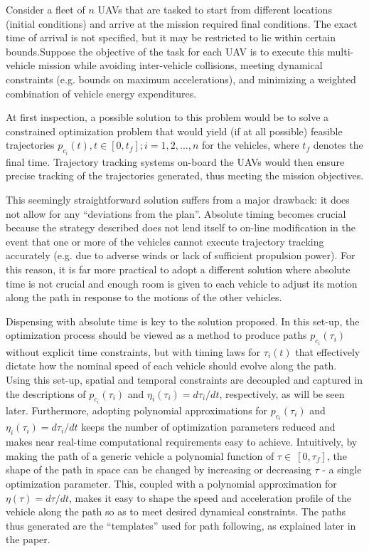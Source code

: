\documentclass[]{aiaa-tc}%
\begin{document}
Consider a fleet of $n$ UAVs that are tasked to start from different
locations (initial conditions) and arrive at the mission required final
conditions. The exact time of arrival is not specified, but it may be
restricted to lie within certain bounds.Suppose the objective of the task
for each UAV is to execute this multi-vehicle mission while avoiding
inter-vehicle collisions, meeting dynamical constraints (e.g. bounds on
maximum accelerations), and minimizing a weighted combination of vehicle
energy expenditures.

At first inspection, a possible solution to this problem would be to solve a
constrained optimization problem that would yield (if at all possible)
feasible trajectories $p_{c_i}(t), t \in [0, t_f]; i=1,2,...,n$ for the
vehicles, where $t_f$ denotes the final time. Trajectory tracking systems
on-board the UAVs would then ensure precise tracking of the trajectories
generated, thus meeting the mission objectives.

This seemingly straightforward solution suffers from a major drawback: it
does not allow for any ``deviations from the plan''. Absolute timing becomes
crucial because the strategy described does not lend itself to on-line
modification in the event that one or more of the vehicles cannot execute
trajectory tracking accurately (e.g. due to adverse winds or lack of
sufficient propulsion power). For this reason, it is far more practical to
adopt a different solution where absolute time is not crucial and enough
room is given to each vehicle to adjust its motion along the path in
response to the motions of the other vehicles.

Dispensing with absolute time is key to the solution proposed. In this
set-up, the optimization process should be viewed as a method to produce
paths $p_{c_i}(\tau_i)$ without explicit time constraints, but with timing
laws for $\tau_i(t)$ that effectively dictate how the nominal speed of each
vehicle should evolve along the path. Using this set-up, spatial and
temporal constraints are decoupled and captured in the descriptions of
$p_{c_i}(\tau_i)$ and $\eta_i(\tau_i)=d\tau_i/dt$, respectively, as will be
seen later. Furthermore, adopting polynomial approximations for
$p_{c_i}(\tau_i)$ and $\eta_i(\tau_i)=d\tau_i/dt$ keeps the number of
optimization parameters reduced and makes near real-time computational
requirements easy to achieve. Intuitively, by making the path of a generic
vehicle a polynomial function of  $\tau \in \ [0, \tau_f ]$, the shape of
the path in space can be changed by increasing or decreasing $\tau$ - a
single optimization parameter. This, coupled with a polynomial approximation
for $\eta(\tau)=d\tau/dt$, makes it easy to shape the speed and acceleration
profile of the vehicle along the path so as to meet desired dynamical
constraints. The paths thus generated are the ``templates'' used for path
following, as explained later in the paper.
\end{document}
